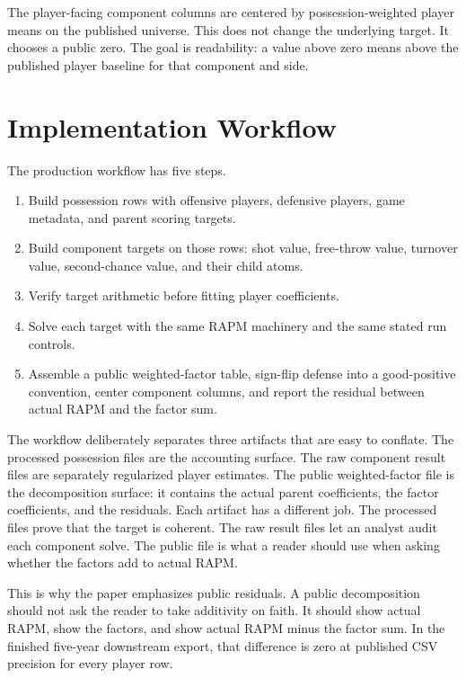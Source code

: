 \documentclass[11pt]{article}
\begin{document}
The player-facing component columns are centered by possession-weighted player
means on the published universe.  This does not change the underlying target.
It chooses a public zero.  The goal is readability: a value above zero means
above the published player baseline for that component and side.

\section{Implementation Workflow}

The production workflow has five steps.

\begin{enumerate}[leftmargin=*]
\item Build possession rows with offensive players, defensive players, game
metadata, and parent scoring targets.
\item Build component targets on those rows: shot value, free-throw value,
turnover value, second-chance value, and their child atoms.
\item Verify target arithmetic before fitting player coefficients.
\item Solve each target with the same RAPM machinery and the same stated run
controls.
\item Assemble a public weighted-factor table, sign-flip defense into a
good-positive convention, center component columns, and report the residual
between actual RAPM and the factor sum.
\end{enumerate}

The workflow deliberately separates three artifacts that are easy to conflate.
The processed possession files are the accounting surface.  The raw component
result files are separately regularized player estimates.  The public
weighted-factor file is the decomposition surface: it contains the actual
parent coefficients, the factor coefficients, and the residuals.  Each artifact
has a different job.  The processed files prove that the target is coherent.
The raw result files let an analyst audit each component solve.  The public file
is what a reader should use when asking whether the factors add to actual RAPM.

This is why the paper emphasizes public residuals.  A public decomposition
should not ask the reader to take additivity on faith.  It should show actual
RAPM, show the factors, and show actual RAPM minus the factor sum.  In the
finished five-year downstream export, that difference is zero at published CSV
precision for every player row.
\end{document}
